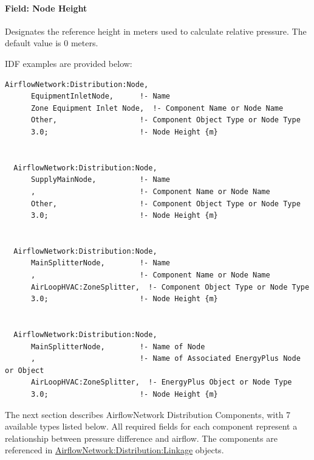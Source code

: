 \paragraph{Field: Node Height}\label{field-node-height-1}

Designates the reference height in meters used to calculate relative pressure. The default value is 0 meters.

IDF examples are provided below:

\begin{lstlisting}
AirflowNetwork:Distribution:Node,
      EquipmentInletNode,      !- Name
      Zone Equipment Inlet Node,  !- Component Name or Node Name
      Other,                   !- Component Object Type or Node Type
      3.0;                     !- Node Height {m}


  AirflowNetwork:Distribution:Node,
      SupplyMainNode,          !- Name
      ,                        !- Component Name or Node Name
      Other,                   !- Component Object Type or Node Type
      3.0;                     !- Node Height {m}


  AirflowNetwork:Distribution:Node,
      MainSplitterNode,        !- Name
      ,                        !- Component Name or Node Name
      AirLoopHVAC:ZoneSplitter,  !- Component Object Type or Node Type
      3.0;                     !- Node Height {m}


  AirflowNetwork:Distribution:Node,
      MainSplitterNode,        !- Name of Node
      ,                        !- Name of Associated EnergyPlus Node or Object
      AirLoopHVAC:ZoneSplitter,  !- EnergyPlus Object or Node Type
      3.0;                     !- Node Height {m}
\end{lstlisting}

The next section describes AirflowNetwork Distribution Components, with 7 available types listed below. All required fields for each component represent a relationship between pressure difference and airflow. The components are referenced in \hyperref[airflownetworkdistributionlinkage]{AirflowNetwork:Distribution:Linkage} objects.

